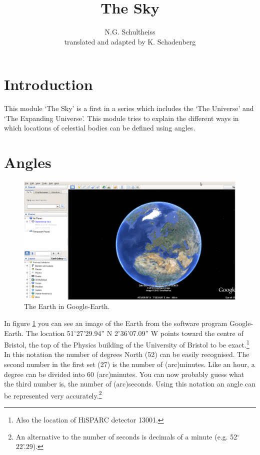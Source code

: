 \documentclass[12pt,a4paper]{article}
\author{N.G. Schultheiss \\ translated and adapted by K. Schadenberg}
\date{}
\title{The Sky}
\numberwithin{equation}{section}
\numberwithin{figure}{section}
\numberwithin{table}{section}
\begin{document}
\maketitle

\section{Introduction}
This module `The Sky' is a first in a series which includes the `The Universe' and `The Expanding Universe'. This module tries to explain the different ways in which locations of celestial bodies can be defined using angles.

\section{Angles}
\begin{figure}\begin{center}
\includegraphics[scale=0.33]{GE_earth.eps}
\caption{The Earth in Google-Earth.}\label{fig:GE_earth}
\end{center}\end{figure} 

In figure \ref{fig:GE_earth} you can see an image of the Earth from the software program Google-Earth. The location 51$^{\circ}$27'29.94'' N 2$^{\circ}$36'07.09'' W points toward the centre of Bristol, the top of the Physics building of the University of Bristol to be exact.\footnote{Also the location of HiSPARC detector 13001.} In this notation the number of degrees North (52) can be easily recognised. The second number in the first set (27) is the number of (arc)minutes. Like an hour, a degree can be divided into 60 (arc)minutes. You can now probably guess what the third number is, the number of (arc)seconds. Using this notation an angle can be represented very accurately.\footnote{An alternative to the number of seconds is decimals of a minute (e.g. 52$^{\circ}$22'.29).}
\end{document}
